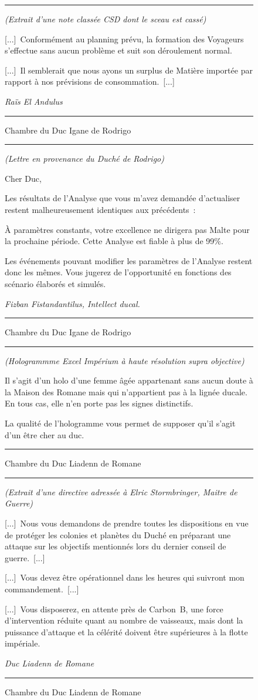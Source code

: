 \documentclass{article}
\newcommand{\newcharacter}{\clearpage\setcounter{figure}{0}}
\newcommand{\indice}[4]{
  \begin{figure}[H]
    \begin{center}
      \rule{0.5\textwidth}{1pt}
    \end{center}
    \begin{framed}
      \begin{samepage}
        \textit{#1}
        \nopagebreak

        #2

        \nopagebreak

        \hfill\textit{#3}
      \end{samepage}
    \end{framed}
    \caption{#4}
    \begin{center}
      \rule{0.5\textwidth}{1pt}
    \end{center}
  \end{figure}
}
\begin{document}
\indice
{(Extrait d'une note classée CSD dont le sceau est cassé)}
{[...]~Conformément au planning prévu, la formation des Voyageurs s'effectue
sans aucun problème et suit son déroulement normal.

\nobreak

[...]~Il semblerait que nous ayons un surplus de Matière importée par rapport à
nos prévisions de consommation.~[...]}
{Raïs El Andulus}
{Chambre du Duc Igane de Rodrigo}

\indice
{(Lettre en provenance du Duché de Rodrigo)}
{Cher Duc,

\nobreak

Les résultats de l'Analyse que vous m'avez demandée d'actualiser restent
malheureusement identiques aux précédents~:

\nobreak

À paramètres constants, votre excellence ne dirigera pas Malte pour la
prochaine période. Cette Analyse est fiable à plus de 99\%.

\nobreak

Les événements pouvant modifier les paramètres de l'Analyse restent donc les
mêmes. Vous jugerez de l'opportunité en fonctions des scénario élaborés et
simulés.}
{Fizban Fistandantilus, Intellect ducal.}
{Chambre du Duc Igane de Rodrigo}

\newcharacter

\indice
{(Hologrammme Excel Impérium à haute résolution supra objective)}
{Il s'agit d'un holo d'une femme âgée appartenant sans aucun doute à la Maison
des Romane mais qui n'appartient pas à la lignée ducale. En tous cas, elle n'en
porte pas les signes distinctifs.

\nobreak

La qualité de l'hologramme vous permet de supposer qu'il s'agit d'un être cher
au duc.}
{}
{Chambre du Duc Liadenn de Romane}

\indice
{(Extrait d'une directive adressée à Elric Stormbringer, Maitre de Guerre)}
{[...]~Nous vous demandons de prendre toutes les dispositions en vue de
protéger les colonies et planètes du Duché en préparant une attaque sur les
objectifs mentionnés lors du dernier conseil de guerre.~[...]

\nobreak

[...]~Vous devez être opérationnel dans les heures qui suivront mon
commandement.~[...]

\nobreak

[...]~Vous disposerez, en attente près de Carbon~B, une force d'intervention
réduite quant au nombre de vaisseaux, mais dont la puissance d'attaque et la
célérité doivent être supérieures à la flotte impériale.}
{Duc Liadenn de Romane}
{Chambre du Duc Liadenn de Romane}
\end{document}
